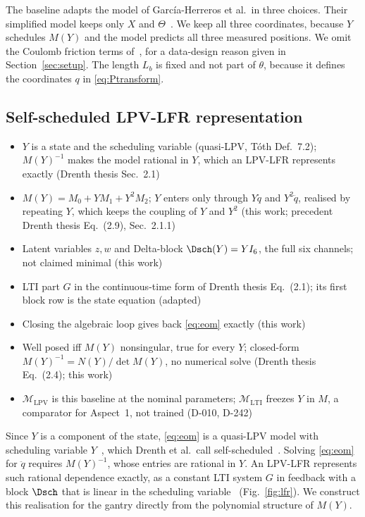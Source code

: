 The baseline adapts the model of Garc\'ia-Herreros et al.\ in three choices.
Their simplified model keeps only $X$ and
$\Theta$~\cite[Eq.~(11)]{garcia2013model}.
We keep all three coordinates, because $Y$ schedules $M(Y)$ and the model
predicts all three measured positions.
We omit the Coulomb friction terms
of~\cite[Eq.~(6)]{garcia2013model}, for a data-design reason given in
Section~\ref{sec:setup}.
The length $L_b$ is fixed and not part of $\theta$, because it defines the
coordinates $q$ in \eqref{eq:Ptransform}.

\subsection{Self-scheduled LPV-LFR representation}\label{sec:lfr}
\ifdraft
\begin{itemize}
\item $Y$ is a state and the scheduling variable (quasi-LPV, T\'oth Def.~7.2); $M(Y)^{-1}$ makes the model rational in $Y$, which an LPV-LFR represents exactly (Drenth thesis Sec.~2.1)
\item $M(Y)=M_0+YM_1+Y^2M_2$; $Y$ enters only through $Y\ddot q$ and $Y^2\ddot q$, realised by repeating $Y$, which keeps the coupling of $Y$ and $Y^2$ (this work; precedent Drenth thesis Eq.~(2.9), Sec.~2.1.1)
\item Latent variables $z,w$ and Delta-block $\Dsch(Y)=YI_6$, the full six channels; not claimed minimal (this work)
\item LTI part $G$ in the continuous-time form of Drenth thesis Eq.~(2.1); its first block row is the state equation (adapted)
\item Closing the algebraic loop gives back \eqref{eq:eom} exactly (this work)
\item Well posed iff $M(Y)$ nonsingular, true for every $Y$; closed-form $M(Y)^{-1}=N(Y)/\det M(Y)$, no numerical solve (Drenth thesis Eq.~(2.4); this work)
\item $\mathcal M_{\mathrm{LPV}}$ is this baseline at the nominal parameters; $\mathcal M_{\mathrm{LTI}}$ freezes $Y$ in $M$, a comparator for Aspect~1, not trained (D-010, D-242)
\end{itemize}
\fi
Since $Y$ is a component of the state, \eqref{eq:eom} is a quasi-LPV model
with scheduling variable $Y$~\cite[Def.~7.2]{toth2010modeling}, which Drenth
et al.\ call self-scheduled~\cite[Sec.~3.2]{drenth2025lpvlfr}.
Solving \eqref{eq:eom} for $\ddot q$ requires $M(Y)^{-1}$, whose entries are
rational in $Y$.
An LPV-LFR represents such rational dependence exactly, as a constant LTI
system $G$ in feedback with a block $\Dsch$ that is linear in the scheduling
variable~\cite[Sec.~2.1]{drenth2025thesis} (Fig.~\ref{fig:lfr}).
We construct this realisation for the gantry directly from the polynomial
structure of $M(Y)$.

